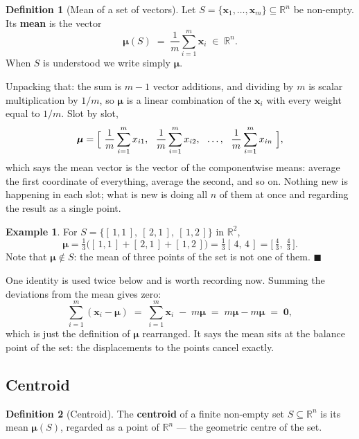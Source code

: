 \documentclass[11pt]{article}
\theoremstyle{plain}
\theoremstyle{definition}
\newtheorem{defn}{Definition}[section]
\newtheorem{ex}{Example}[section]
\theoremstyle{remark}
\newcommand{\R}{\mathbb{R}}
\newcommand{\vc}[1]{\mathbf{#1}}
\newcommand{\bmu}{\boldsymbol{\mu}}
\begin{document}
\begin{defn}[Mean of a set of vectors]
Let $S=\{\vc{x}_1,\dots,\vc{x}_m\}\subseteq\R^{n}$ be non-empty. Its
\textbf{mean} is the vector
\[
  \bmu(S)
  \;=\; \frac{1}{m}\sum_{i=1}^{m}\vc{x}_i
  \;\in\; \R^{n} .
\]
When $S$ is understood we write simply $\bmu$.
\end{defn}

\noindent Unpacking that: the sum is $m-1$ vector additions, and dividing by $m$
is scalar multiplication by $1/m$, so $\bmu$ is a linear combination of the
$\vc{x}_i$ with every weight equal to $1/m$. Slot by slot,
\[
  \bmu
  = \Bigl[\ \frac{1}{m}\sum_{i=1}^{m}x_{i1},
    \ \ \frac{1}{m}\sum_{i=1}^{m}x_{i2},
    \ \ \dots,
    \ \ \frac{1}{m}\sum_{i=1}^{m}x_{in}\ \Bigr],
\]
which says the mean vector is the vector of the componentwise means: average the
first coordinate of everything, average the second, and so on. Nothing new is
happening in each slot; what is new is doing all $n$ of them at once and
regarding the result as a single point.

\begin{ex}
For $S=\{[\,1,1\,],\ [\,2,1\,],\ [\,1,2\,]\}$ in $\R^{2}$,
\[
  \bmu
  = \tfrac13\bigl([\,1,1\,]+[\,2,1\,]+[\,1,2\,]\bigr)
  = \tfrac13[\,4,\,4\,]
  = \bigl[\,\tfrac43,\ \tfrac43\,\bigr] .
\]
Note that $\bmu\notin S$: the mean of three points of the set is not one of
them. \hfill$\blacksquare$
\end{ex}

\noindent One identity is used twice below and is worth recording now. Summing
the deviations from the mean gives zero:
\[
  \sum_{i=1}^{m}(\vc{x}_i - \bmu)
  \;=\; \sum_{i=1}^{m}\vc{x}_i \;-\; m\bmu
  \;=\; m\bmu - m\bmu
  \;=\; \vc{0} ,
\]
which is just the definition of $\bmu$ rearranged. It says the mean sits at
the balance point of the set: the displacements to the points cancel exactly.

\subsection{Centroid}
\begin{defn}[Centroid]
The \textbf{centroid} of a finite non-empty set $S\subseteq\R^{n}$ is its mean
$\bmu(S)$, regarded as a point of $\R^{n}$ --- the geometric centre of the
set.
\end{defn}
\end{document}

